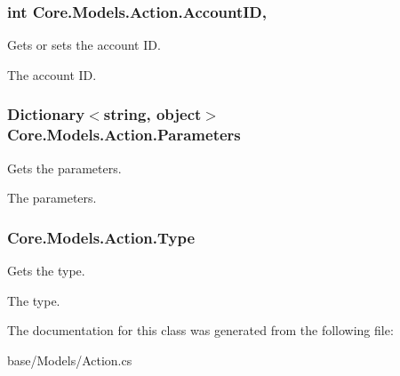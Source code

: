 \subsubsection[{Account\+I\+D}]{\setlength{\rightskip}{0pt plus 5cm}int Core.\+Models.\+Action.\+Account\+I\+D\hspace{0.3cm}{\ttfamily [get]}, {\ttfamily [set]}}\label{classCore_1_1Models_1_1Action_ae2defe30307109c1265b4cf16c001553}


Gets or sets the account I\+D. 

The account I\+D.\hypertarget{classCore_1_1Models_1_1Action_a5b7b51347229bf4ca6ab02b419c476b8}{}
\subsubsection[{Parameters}]{\setlength{\rightskip}{0pt plus 5cm}Dictionary$<$string, object$>$ Core.\+Models.\+Action.\+Parameters\hspace{0.3cm}{\ttfamily [get]}}\label{classCore_1_1Models_1_1Action_a5b7b51347229bf4ca6ab02b419c476b8}


Gets the parameters. 

The parameters.\hypertarget{classCore_1_1Models_1_1Action_abb5ac940b539ea5f61f866c219dcd858}{}
\subsubsection[{Type}]{ Core.\+Models.\+Action.\+Type\hspace{0.3cm}{\ttfamily [get]}}\label{classCore_1_1Models_1_1Action_abb5ac940b539ea5f61f866c219dcd858}


Gets the type. 

The type.

The documentation for this class was generated from the following file\+:\begin{DoxyCompactItemize}
\item 
base/\+Models/Action.\+cs\end{DoxyCompactItemize}
